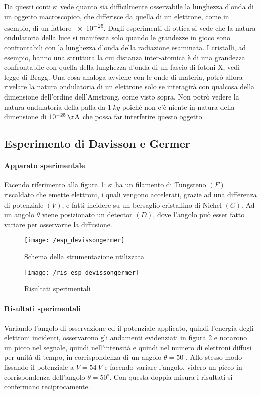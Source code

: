 Da questi conti si vede quanto sia difficilmente osservabile la lunghezza d'onda di un oggetto macroscopico, che differisce da quella di un elettrone, come in esempio, di un fattore \SI{e-25}{}.
Dagli esperimenti di ottica si vede che la natura ondulatoria della luce si manifesta solo quando le grandezze in gioco sono confrontabili con la lunghezza d'onda della radiazione esaminata.
I cristalli, ad esempio, hanno una struttura la cui distanza inter-atomica è di una grandezza confrontabile con quella della lunghezza d'onda di un fascio di fotoni X, vedi legge di Bragg.
Una cosa analoga avviene con le onde di materia, potrò allora rivelare la natura ondulatoria di un elettrone solo se interagirà con qualcosa della dimensione dell'ordine dell'Amstrong, come visto sopra.
Non potrò vedere la natura ondulatoria della palla da $\SI{1}{kg}$ poiché non c'è niente in natura della dimensione di $\SI{e-25}{\AA}$ che possa far interferire questo oggetto.



\subsection{Esperimento di Davisson e Germer}
\paragraph{Apparato sperimentale} 
Facendo riferimento alla figura \ref{app_spe}: si ha un filamento di Tungsteno $(F)$ riscaldato che emette elettroni, i quali vengono accelerati, grazie ad una differenza di potenziale $(V)$, e fatti incidere su un bersaglio cristallino di Nichel $(C)$.
Ad un angolo $\theta$ viene posizionato un detector $(D)$, dove l'angolo può esser fatto variare per osservarne la diffusione.

\begin{figure}[h]
\centering
\texttt{[image: /esp\_devissongermer]}
\caption{Schema della strumentazione utilizzata}
\label{app_spe}
\end{figure}
\begin{figure}[h]
\centering
\texttt{[image: /ris\_esp\_devissongermer]}
\caption{Risultati sperimentali}
\label{res_spe}
\end{figure}

\paragraph{Risultati sperimentali}
Variando l'angolo di osservazione ed il potenziale applicato, quindi l'energia degli elettroni incidenti, osservarono gli andamenti evidenziati in figura \ref{res_spe} e notarono un picco nel segnale, quindi nell'intensità e quindi nel numero di elettroni diffusi per unità di tempo, in corrispondenza di un angolo $\theta = 50^{\circ}$.
Allo stesso modo fissando il potenziale a $V = \SI{54}{V}$ e facendo variare l'angolo, videro un picco in corrispondenza dell'angolo $\theta = 50^{\circ}$.
Con questa doppia misura i risultati si confermano reciprocamente.

